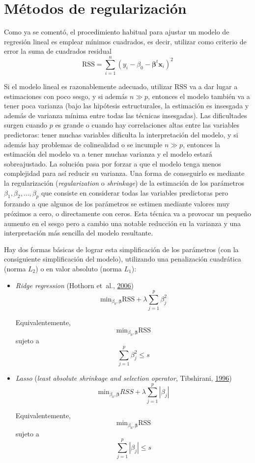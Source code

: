 \documentclass[
  spanish,
]{book}
\theoremstyle{break}
\theoremstyle{definition}
\theoremstyle{definition}
\theoremstyle{definition}
\theoremstyle{remark}
\begin{document}
\hypertarget{shrinkage}{%
\section{Métodos de regularización}\label{shrinkage}}

Como ya se comentó, el procedimiento habitual para ajustar un modelo de regresión lineal es emplear mínimos cuadrados, es decir, utilizar como criterio de error la suma de cuadrados residual
\[\mbox{RSS} = \sum\limits_{i=1}^{n}\left(  y_{i} - \beta_0 - \boldsymbol{\beta}^t \mathbf{x}_{i} \right)^{2}\]

Si el modelo lineal es razonablemente adecuado, utilizar \(\mbox{RSS}\) va a dar lugar a estimaciones con poco sesgo, y si además \(n\gg p\), entonces el modelo también va a tener poca varianza (bajo las hipótesis estructurales, la estimación es insesgada y además de varianza mínima entre todas las técnicas insesgadas).
Las dificultades surgen cuando \(p\) es grande o cuando hay correlaciones altas entre las variables predictoras: tener muchas variables dificulta la interpretación del modelo, y si además hay problemas de colinealidad o se incumple \(n\gg p\), entonces la estimación del modelo va a tener muchas varianza y el modelo estará sobreajustado.
La solución pasa por forzar a que el modelo tenga menos complejidad para así reducir su varianza.
Una forma de conseguirlo es mediante la regularización (\emph{regularization} o \emph{shrinkage}) de la estimación de los parámetros \(\beta_1, \beta_2,\ldots, \beta_p\) que consiste en considerar todas las variables predictoras pero forzando a que algunos de los parámetros se estimen mediante valores muy próximos a cero, o directamente con ceros.
Esta técnica va a provocar un pequeño aumento en el sesgo pero a cambio una notable reducción en la varianza y una interpretación más sencilla del modelo resultante.

Hay dos formas básicas de lograr esta simplificación de los parámetros (con la consiguiente simplificación del modelo), utilizando una penalización cuadrática (norma \(L_2\)) o en valor absoluto (norma \(L_1\)):

\begin{itemize}
\item
  \emph{Ridge regression} (Hothorn et~al., \protect\hyperlink{ref-hothorn2006unbiased}{2006})
  \[\mbox{min}_{\beta_0, \boldsymbol{\beta}} \mbox{RSS} + \lambda\sum_{j=1}^{p}\beta_{j}^{2}\]

  Equivalentemente,
  \[\mbox{min}_{\beta_0, \boldsymbol{\beta}} \mbox{RSS}\]
  sujeto a
  \[\sum_{j=1}^{p}\beta_{j}^{2} \le s\]
\item
  \emph{Lasso} (\emph{least absolute shrinkage and selection operator}, Tibshirani, \protect\hyperlink{ref-tibshirani1996regression}{1996})
  \[\mbox{min}_{\beta_0, \boldsymbol{\beta}} RSS + \lambda\sum_{j=1}^{p}|\beta_{j}|\]

  Equivalentemente,
  \[\mbox{min}_{\beta_0, \boldsymbol{\beta}} \mbox{RSS}\]
  sujeto a
  \[\sum_{j=1}^{p}|\beta_{j}| \le s\]
\end{itemize}
\end{document}
